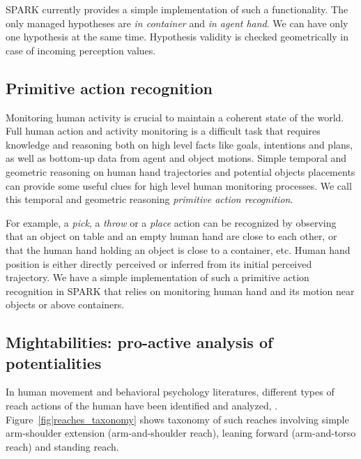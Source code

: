 \documentclass{svmult}
\begin{document}
SPARK currently provides a simple implementation of such a functionality. The
only managed hypotheses are \emph{in container} and \emph{in agent hand}. We
can have only one hypothesis at the same time. Hypothesis validity is checked
geometrically in case of incoming perception values.


\subsection{Primitive action recognition}

Monitoring human activity is crucial to maintain a coherent state of the world.
Full human action and activity monitoring is a difficult task that requires
knowledge and reasoning both on high level facts like goals, intentions and
plans, as well as bottom-up data from agent and object motions. Simple temporal
and geometric reasoning on human hand trajectories and potential objects
placements can provide some useful clues for high level human monitoring
processes. We call this temporal and geometric reasoning \emph{primitive action
recognition}.

For example, a \emph{pick}, a \emph{throw} or a \emph{place} action can be
recognized by observing that an object on table and an empty human hand are
close to each other, or that the human hand holding an object is close to a
container, etc. Human hand position is either directly perceived or inferred
from its initial perceived trajectory.  We have a simple implementation of such
a primitive action recognition in SPARK that relies on monitoring human hand
and its motion near objects or above containers.



\subsection{Mightabilities: pro-active analysis of potentialities}


In human movement and behavioral psychology literatures, different types of
reach actions of the human have been identified and analyzed,
\cite{Gardner2001, Choi2004}.  Figure~\ref{fig|reaches_taxonomy} shows taxonomy
of such reaches involving simple arm-shoulder extension (arm-and-shoulder
reach), leaning forward (arm-and-torso reach) and standing reach.
\end{document}
